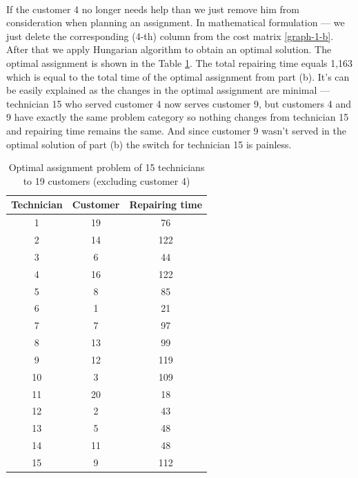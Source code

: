 \begin{enumerate}[(a)]
	\paragraph{}
	If the customer 4 no longer needs help than we just remove him from consideration when planning an assignment. In mathematical formulation --- we just delete the corresponding (4-th) column from the cost matrix \ref{graph-1-b}. After that we apply Hungarian algorithm to obtain an optimal solution. The optimal assignment is shown in the Table \ref{hungarian-1-f}. The total repairing time equals 1,163 which is equal to the total time of the optimal assignment from part (b). It's can be easily explained as the changes in the optimal assignment are minimal --- technician 15 who served customer 4 now serves customer 9, but customers 4 and 9 have exactly the same problem category so nothing changes from technician 15 and repairing time remains the same. And since customer 9 wasn't served in the optimal solution of part (b) the switch for technician 15 is painless.

\begin{table}[H]
	\centering
	\caption{Optimal assignment problem of 15 technicians to 19 customers (excluding customer 4)}
	\begin{tabular}{|c|c|c|}\hline
Technician & Customer & Repairing time \\ \hline
1 & 19 & 76 \\
2 & 14 & 122 \\
3 & 6 & 44 \\
4 & 16 & 122 \\
5 & 8 & 85 \\
6 & 1 & 21 \\
7 & 7 & 97 \\
8 & 13 & 99 \\
9 & 12 & 119 \\
10 & 3 & 109 \\
11 & 20 & 18 \\
12 & 2 & 43 \\
13 & 5 & 48 \\
14 & 11 & 48 \\
15 & 9 & 112 \\
\hline
	\end{tabular}
	\label{hungarian-1-f}
\end{table}

\end{enumerate}